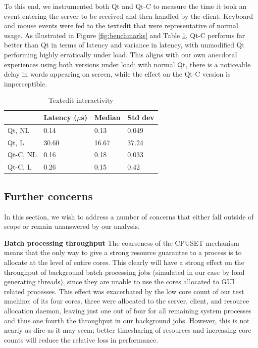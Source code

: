 \documentclass[letterpaper,twocolumn,10pt]{article}
\begin{document}
To this end, we instrumented both Qt and Qt-C to measure the time it took an event entering the server to be received and then handled by the client. Keyboard and mouse events were fed to the textedit that were representative of normal usage. As illustrated in Figure \ref{fig:benchmarks} and Table \ref{tab:textedit_table}, Qt-C performs far better than Qt in terms of latency and variance in latency, with unmodified Qt performing highly erratically under load. This aligns with our own anecdotal experiences using both versions under load; with normal Qt, there is a noticeable delay in words appearing on screen, while the effect on the Qt-C version is imperceptible.

\begin{table}[htp]
\caption{Textedit interactivity}
\label{tab:textedit_table}
\centering
\begin{tabular}{|l | l | l | l |}
\hline
	&Latency ($\mu$s)	&Median	&Std dev\\ \hline
Qt, NL	&0.14	&0.13	&0.049\\
Qt, L	&30.60	&16.67	&37.24\\
Qt-C, NL	&0.16	&0.18	&0.033\\
Qt-C, L	&0.26	&0.15	&0.42\\
\hline
\end{tabular}
\end{table}

\subsection{Further concerns}

In this section, we wish to address a number of concerns that either fall outside of scope or remain unanswered by our analysis.

\textbf{Batch processing throughput} The coarseness of the CPUSET mechanism means that the only way to give a strong resource guarantee to a process is to allocate at the level of entire cores. This clearly will have a strong effect on the throughput of background batch processing jobs (simulated in our case by load generating threads), since they are unable to use the cores allocated to GUI related processes. This effect was exacerbated by the low core count of our test machine; of its four cores, three were allocated to the server, client, and resource allocation daemon, leaving just one out of four for all remaining system processes and thus one fourth the throughput in our background jobs. However, this is not nearly as dire as it may seem; better timesharing of resources and increasing core counts will reduce the relative loss in performance.
\end{document}
